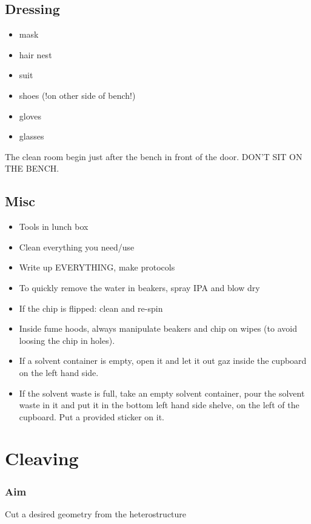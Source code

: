 \documentclass[12pt,a4paper]{report}
\begin{document}
\newpage

\subsection{Dressing}
\begin{itemize}
\item mask
\item hair nest
\item suit
\item shoes (!on other side of bench!)
\item gloves
\item glasses
\end{itemize}

The clean room begin just after the bench in front of the door. DON'T SIT ON THE BENCH.

\subsection{Misc}

\begin{itemize}
\item Tools in lunch box
\item Clean everything you need/use
\item Write up EVERYTHING, make protocols
\item To quickly remove the water in beakers, spray IPA and blow dry
\item If the chip is flipped: clean and re-spin
\item Inside fume hoods, always manipulate beakers and 
chip on wipes (to avoid loosing the chip in holes).
\item If a solvent container is empty, open it and let it out gaz inside
the cupboard on the left hand side.
\item If the solvent waste is full, take an empty solvent container,
pour the solvent waste in it and put it in the bottom left hand
side shelve, on the left of the cupboard. Put a provided sticker
on it.
\end{itemize}

\newpage

\section{Cleaving}
\subsubsection{Aim}
Cut a desired geometry from the heterostructure
\end{document}
